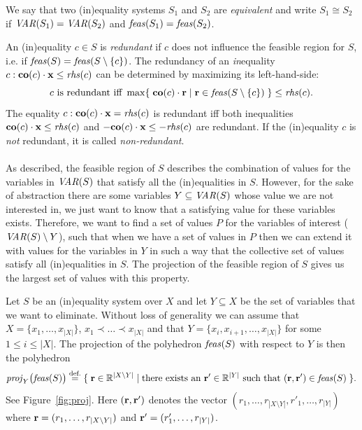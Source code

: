 {We say that two (in)equality systems $S_1$ and $S_2$ are \emph{equivalent} and write $S_1\cong S_2$ if 
$\mathit{VAR}(S_1)=\mathit{VAR}(S_2)$ and $\mathit{feas}(S_1) = \mathit{feas}(S_2)$.}

An (in)equality $c\in S$ is \emph{redundant} if $c$ does not influence the feasible region for $S$, i.e. if $\mathit{feas}(S)=\mathit{feas}(S\setminus\{c\})$. The redundancy of an \emph{in}equality $c: \mathbf{co}(c)\cdot\mathbf{x}\leq \mathit{rhs}(c)$ can be determined by maximizing its left-hand-side:  
\begin{equation}\label{eq:redundant}
c \text{ is redundant iff }\max\{\;{\mathbf{co}(c)\cdot\mathbf{r}}\;|\;{\mathbf{r}\in \mathit{feas}(S\setminus\{c\})}\;\} \leq \mathit{rhs}(c).
\end{equation}
The equality $c: \mathbf{co}(c)\cdot\mathbf{x} = \mathit{rhs}(c)$ 
is redundant iff both inequalities 
$\mathbf{co}(c)\cdot\mathbf{x} \leq \mathit{rhs}(c)$ and $-\mathbf{co}(c)\cdot\mathbf{x} \leq -\mathit{rhs}(c)$ 
are redundant.
If the (in)equality $c$ is \emph{not} redundant, it is called \emph{non-redundant}.
%
\\\\
As described, the feasible region of $S$ describes the combination of values for the variables in $\mathit{VAR}(S)$ that satisfy all the (in)equalities in $S$. However, for the sake of abstraction there are some variables $Y\subseteq \mathit{VAR}(S)$ whose value we are not interested in, we just want to know that a satisfying value for these variables exists.  
Therefore, we want to find a set of values $P$ for the variables of interest ($\mathit{VAR}(S)\setminus Y$), such that when we have a set of values in $P$ then we can extend it with values for the variables in $Y$ in such a way that the collective set of values satisfy all (in)equalities in $S$. 
The {projection} of the feasible region of $S$ gives us the largest set of values with this property.

Let $S$ be an (in)equality system over $X$ and let $Y\subseteq X$ be the set of variables that we want to eliminate. Without loss of generality we can assume that $X = \{x_1,\ldots, x_{|X|}\}$, $x_1\prec \ldots \prec x_{|X|}$ and that $Y=\{x_i, x_{i+1}, \ldots, x_{|X|}\}$ for some $1\leq i\leq |X|$.
The {projection} of the polyhedron $\mathit{feas}(S)$ with respect to $Y$ is then the polyhedron 
\[
\mathit{proj}_Y\big(\mathit{feas}(S)\big) \overset{\text{def.}}= \{\;{\mathbf{r}\in\mathbb{R}^{|X\setminus Y|}}\;|\;{\text{there exists an } \mathbf{r}'\in\mathbb{R}^{|Y|}\text{ such that }
(\mathbf{r},\mathbf{r'})\in \mathit{feas}(S)}\;\}.
\]
See Figure~\ref{fig:proj}. Here $(\mathbf{r},\mathbf{r'})$ denotes the vector $(r_1,\ldots, r_{|X\setminus Y|}, r'_1,\ldots, r_{|Y|})$ where $\mathbf{r}=(r_1,\ldots, r_{|X\setminus Y|})$ and $\mathbf{r'}=(r'_1,\ldots, r_{|Y|})$.

